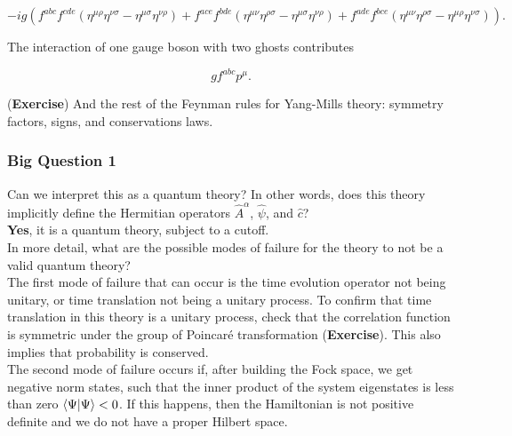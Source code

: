 \begin{equation}
-ig ( f^{abc} f^{cde} (\eta^{\mu\rho} \eta^{\nu\sigma} - \eta^{\mu\sigma} \eta^{\nu\rho}) + f^{ace} f^{bde} (\eta^{\mu\nu} \eta^{\rho\sigma} - \eta^{\mu\sigma} \eta^{\nu\rho}) + f^{ade} f^{bce} (\eta^{\mu\nu} \eta^{\rho\sigma} - \eta^{\mu\rho} \eta^{\nu\sigma}) ).
\end{equation}

\noindent The interaction of one gauge boson with two ghosts contributes

\begin{equation}
g f^{abc} p^\mu.
\end{equation}

\noindent (\textbf{Exercise}) And the rest of the Feynman rules for Yang-Mills theory: symmetry factors, signs, and conservations laws.  \\

\subsubsection*{Big Question 1}

\noindent Can we interpret this as a quantum theory? In other words, does this theory implicitly define the Hermitian operators $\hat{A}^\alpha$, $\hat{\psi}$, and $\hat{c}$? \\

\noindent \textbf{Yes}, it is a quantum theory, subject to a cutoff. \\

\noindent In more detail, what are the possible modes of failure for the theory to not be a valid quantum theory? \\

\noindent The first mode of failure that can occur is the time evolution operator not being unitary, or time translation not being a unitary process. To confirm that time translation in this theory is a unitary process, check that the correlation function is symmetric under the group of Poincar\'e transformation (\textbf{Exercise}). This also implies that probability is conserved. \\

\noindent The second mode of failure occurs if, after building the Fock space, we get negative norm states, such that the inner product of the system eigenstates is less than zero $\braket{\Psi | \Psi} < 0$. If this happens, then the Hamiltonian is not positive definite and we do not have a proper Hilbert space. \\

